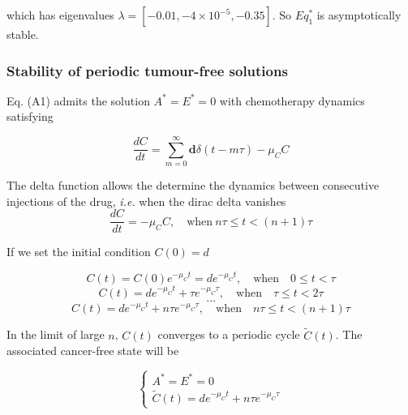 which has eigenvalues $\lambda = [-0.01, -4\times 10^{-5}, -0.35]$. So $Eq_1^*$ is asymptotically stable.
\subsubsection{Stability of periodic tumour-free solutions} 
Eq. (A1) admits the solution $A^* = E^* = 0$ with chemotherapy dynamics satisfying

\[ \frac{dC}{dt} = \sum_{m=0}^\infty \mathbf{d} \delta (t-m\tau) -\mu_C C \]

The delta function allows the determine the dynamics between consecutive injections of the drug, \textit{i.e.} when the dirac delta vanishes
\[ \frac{dC}{dt} = -\mu_C C, \quad \text{when} \ n\tau \leq t < (n+1)\tau  \]

If we set the initial condition $C(0) = d$

\[ C(t) = C(0) e^{-\mu_C t} = d e^{-\mu_C t}, \quad \text{when} \quad 0 \leq t < \tau \]
\[C(t) = d e^{-\mu_C t} + \tau e^{-\mu_C \tau}, \quad \text{when} \quad \tau \leq t < 2\tau \] 
\[\dots\]
\[ C(t) = d e^{-\mu_C t} + n\tau e^{-\mu_C \tau}, \quad \text{when} \quad n\tau \leq t < (n+1)\tau \]

In the limit of large $n$, $C(t)$ converges to a periodic cycle $\tilde{C}(t)$. The associated cancer-free state will be

\[ \begin{cases}
	A^* = E^* = 0 \\ 
	\tilde{C}(t) =  d e^{-\mu_C t} + n\tau e^{-\mu_C \tau} 
\end{cases} \]
